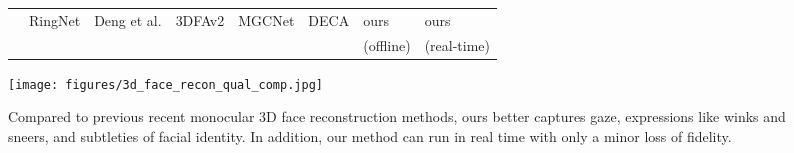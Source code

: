 \begin{figure}[t]
    \scriptsize
    \begin{tabularx}{\textwidth}{YYYYYYYY}
        & RingNet
        & Deng et al.
        & 3DFAv2
        & MGCNet 
        & DECA 
        & ours
        & ours\\
        & \cite{RingNet:CVPR:2019}
        & \cite{deng2019accurate}
        & \cite{guo2020towards}
        & \cite{shang2020self}
        & \cite{Feng:SIGGRAPH:2021}
        & (offline)
        & (real-time)
    \end{tabularx}
    \texttt{[image: figures/3d\_face\_recon\_qual\_comp.jpg]}
    \caption{
Compared to previous recent monocular 3D face reconstruction methods,
ours better captures gaze, expressions like winks and sneers, and subtleties of facial identity.
In addition, our method can run in real time with only a minor loss of fidelity.}
    \label{fig:experiments-3d-recon-qaul}
\end{figure}

